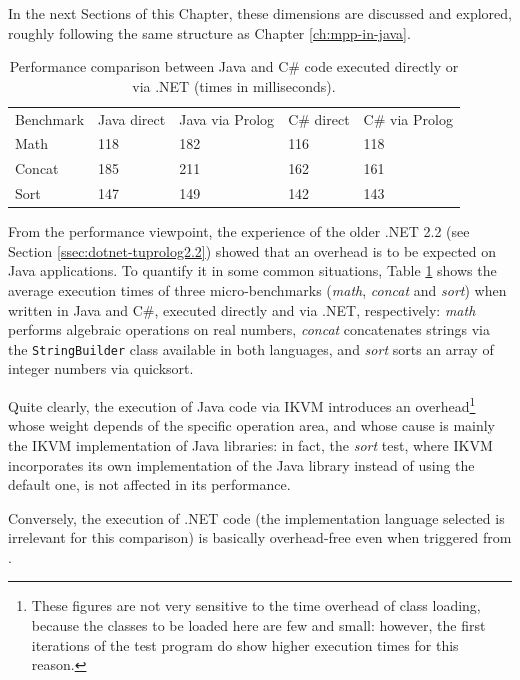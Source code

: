 \noindent In the next Sections of this Chapter, these dimensions are discussed and explored, roughly following the same structure as Chapter \ref{ch:mpp-in-java}.

\begin{table}
{\small
\begin{tabular}{|p{2cm}|p{2cm}|p{2.4cm}|p{2cm}|p{2.2cm}|}
\hline
  Benchmark & Java direct & Java via Prolog & C\# direct & C\# via Prolog\\
  Math   & 118 & 182 & 116 & 118\\
  Concat & 185 & 211 & 162 & 161\\
  Sort   & 147 & 149 & 142 & 143\\
  \hline
\end{tabular}}
  \caption{Performance comparison between Java and C\# code executed directly or via \tuprolog{}.NET (times in milliseconds).}\label{tab:dotnet-benchmarks}
\end{table}

From the performance viewpoint, the experience of the older \tuprolog{}.NET 2.2 (see Section \ref{ssec:dotnet-tuprolog2.2}) showed that an overhead is to be expected on Java applications.
To quantify it in some common situations, Table \ref{tab:dotnet-benchmarks} shows the average execution times of three micro-benchmarks (\textit{math}, \textit{concat} and \textit{sort}) when written in Java and C\#, executed directly and via \tuprolog{}.NET, respectively: \textit{math} performs algebraic operations on real numbers, \textit{concat} concatenates strings via the \texttt{StringBuilder} class available in both languages, and \textit{sort} sorts an array of integer numbers via quicksort.

Quite clearly, the execution of Java code via IKVM introduces an overhead\footnote{These figures are not very sensitive to the time overhead of class loading, because the classes to be loaded here are few and small: however, the first iterations of the test program do show higher execution times for this reason.} whose weight depends of the specific operation area, and whose cause is mainly the IKVM implementation of Java libraries: in fact, the \textit{sort} test, where IKVM incorporates its own implementation of the Java library instead of using the default one, is not affected in its performance.

Conversely, the execution of .NET code (the implementation language selected is irrelevant for this comparison) is basically overhead-free even when triggered from \tuprolog{}.


